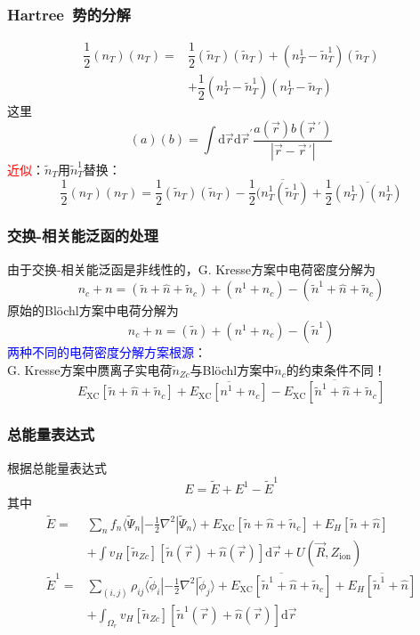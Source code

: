 \documentclass[cjk,slidestop,compress,mathserif,blue]{beamer}
\begin{document}
\frame
{
	\frametitle{\textrm{Hartree~}势的分解}
\begin{displaymath}
	\begin{aligned}
		\dfrac12(n_T)(n_T)=&\dfrac12(\tilde n_T)(\tilde n_T)+(n_T^1-\tilde n_T^1)(\tilde n_T)\\
				&+\dfrac12(n_T^1-\tilde n_T^1)(n_T^1-\tilde n_T)
	\end{aligned}
\end{displaymath}
这里$$(a)(b)=\int\mathrm{d}\vec r\mathrm{d}\vec r^{\prime}\dfrac{a(\vec r)b(\vec r\,^{\prime})}{|\vec r-\vec r\,^{\prime}|}$$
\textcolor{red}{近似}：$\tilde n_T$用$\tilde n_T^1$替换：
\begin{displaymath}
	\dfrac12(n_T)(n_T)=\dfrac12(\tilde n_T)(\tilde n_T)-\dfrac12\overline{(n_T^1(\tilde n_T^1)}+\dfrac12\overline{(n_T^1)(n_T^1)}
\end{displaymath}
}

\frame
{
\frametitle{交换-相关能泛函的处理}
由于交换-相关能泛函是非线性的，\textrm{G. Kresse}方案中电荷密度分解为
\begin{displaymath}
	n_c+n=(\tilde n+\hat n+\tilde n_c)+(n^1+n_c)-(\tilde n^1+\hat n+\tilde n_c)
\end{displaymath}
原始的\textrm{Bl\"ochl}方案中电荷分解为
\begin{displaymath}
	n_c+n=(\tilde n)+(n^1+n_c)-(\tilde n^1)
\end{displaymath}
\textcolor{blue}{两种不同的电荷密度分解方案根源}：\\\textrm{G. Kresse}方案中赝离子实电荷$\tilde n_{Zc}$与\textrm{Bl\"ochl}方案中$\tilde n_c$的约束条件不同！
\begin{displaymath}
	E_{\mathrm{XC}}[\tilde n+\hat n+\tilde n_c]+\overline{E_{\mathrm{XC}}[n^1+n_c]}-\overline{E_{\mathrm{XC}}[\tilde n^1+\hat n+\tilde n_c]}
\end{displaymath}
}

\frame
{
	\frametitle{总能量表达式}
	根据总能量表达式$$E=\tilde E+E^1-\tilde E^1$$其中
	\begin{displaymath}
		\begin{aligned}
			\tilde E=&\sum_nf_n\langle\tilde\Psi_n|-\frac12\nabla^2|\tilde\Psi_n\rangle+E_{\mathrm{XC}}[\tilde n+\hat n+\tilde n_c]+E_H[\tilde n+\hat n]\\
			&+\int v_H[\tilde n_{Zc}][\tilde n(\vec r)+\hat n(\vec r)]\mathrm{d}\vec r+U(\vec R,Z_{\mathrm{ion}})\\
			\tilde E^1=&\sum_{(i,j)}\rho_{ij}\langle\tilde\phi_i|-\frac12\nabla^2|\tilde\phi_j\rangle+\overline{E_{\mathrm{XC}}[\tilde n^1+\hat n+\tilde n_c]}+\overline{E_H[\tilde n^1+\hat n]}\\
			&+\int_{\Omega_r}v_H[\tilde n_{Zc}][\tilde n^1(\vec r)+\hat n(\vec r)]\mathrm{d}\vec r
		\end{aligned}
	\end{displaymath}
}
\end{document}
